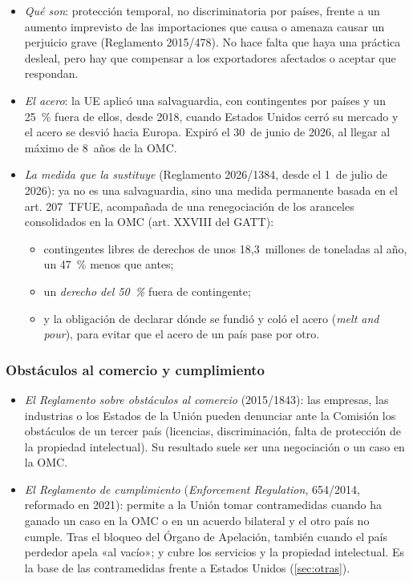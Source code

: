 \documentclass[11pt]{article}
\begin{document}
\begin{itemize}
\item \emph{Qué son}: protección temporal, no discriminatoria por países, frente a un aumento imprevisto de las importaciones que causa o amenaza causar un perjuicio grave (Reglamento 2015/478). No hace falta que haya una práctica desleal, pero hay que compensar a los exportadores afectados o aceptar que respondan.
\item \emph{El acero}: la UE aplicó una salvaguardia, con contingentes por países y un 25~\% fuera de ellos, desde 2018\nocite{CE2026DefensaComercial}, cuando Estados Unidos cerró su mercado y el acero se desvió hacia Europa. Expiró el 30~de junio de 2026, al llegar al máximo de 8~años de la OMC.
\item \emph{La medida que la sustituye} (Reglamento 2026/1384, desde el 1~de julio de 2026)\nocite{CE2026Salvaguardia}: ya no es una salvaguardia, sino una medida permanente basada en el art. 207~TFUE, acompañada de una renegociación de los aranceles consolidados en la OMC (art. XXVIII del GATT):
  \begin{itemize}
  \item contingentes libres de derechos de unos 18,3~millones de toneladas al año, un 47~\% menos que antes\nocite{CE2026Salvaguardia};
  \item un \emph{derecho del 50~\%} fuera de contingente;
  \item y la obligación de declarar dónde se fundió y coló el acero (\emph{melt and pour}), para evitar que el acero de un país pase por otro.
  \end{itemize}
\end{itemize}

\subsubsection{Obstáculos al comercio y cumplimiento}\label{sec:obstaculos}

\begin{itemize}
\item \emph{El Reglamento sobre obstáculos al comercio} (2015/1843): las empresas, las industrias o los Estados de la Unión pueden denunciar ante la Comisión los obstáculos de un tercer país (licencias, discriminación, falta de protección de la propiedad intelectual). Su resultado suele ser una negociación o un caso en la OMC.
\item \emph{El Reglamento de cumplimiento} (\emph{Enforcement Regulation}, 654/2014, reformado en 2021)\nocite{UE2021Ejecucion}: permite a la Unión tomar contramedidas cuando ha ganado un caso en la OMC o en un acuerdo bilateral y el otro país no cumple. Tras el bloqueo del Órgano de Apelación, también cuando el país perdedor apela «al vacío»; y cubre los servicios y la propiedad intelectual. Es la base de las contramedidas frente a Estados Unidos (\ref{sec:otras}).
\end{itemize}
\end{document}
